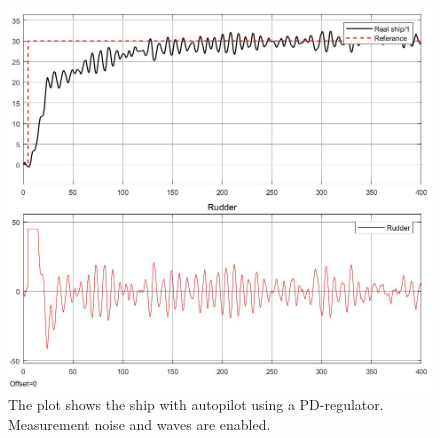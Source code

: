 \begin{figure}[H]
    \centering
    \includegraphics[width=1\textwidth]{Plots/3d_compass_and_ref.jpg}
    \caption{The plot shows the ship with autopilot using a PD-regulator. Measurement noise and waves are enabled.}
    \label{fig: 3d_plot}
\end{figure}